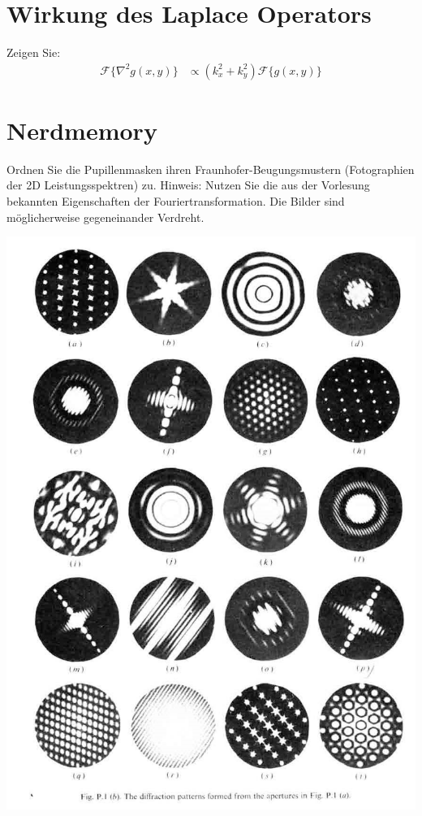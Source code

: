 \documentclass{article}
\begin{document}
\section{Wirkung des Laplace Operators }
Zeigen Sie:
\begin{align}
  \mathcal{F}\{\nabla^2 g(x,y)\} &\propto (k_x^2+k_y^2) \mathcal{F}\{g(x,y)\}
\end{align}

\section{Nerdmemory}
Ordnen Sie die Pupillenmasken ihren Fraunhofer-Beugungsmustern
(Fotographien der 2D Leistungsspektren) zu. Hinweis: Nutzen Sie die
aus der Vorlesung bekannten Eigenschaften der
Fouriertransformation. Die Bilder sind m\"oglicherweise gegeneinander
Verdreht.

\includegraphics[height=.72\textheight, angle=90]{FrequencySpace}
\end{document}
